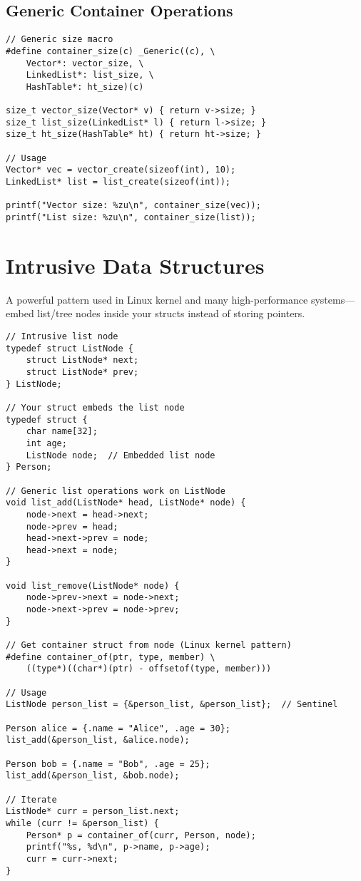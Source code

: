 \subsection{Generic Container Operations}

\begin{lstlisting}
// Generic size macro
#define container_size(c) _Generic((c), \
    Vector*: vector_size, \
    LinkedList*: list_size, \
    HashTable*: ht_size)(c)

size_t vector_size(Vector* v) { return v->size; }
size_t list_size(LinkedList* l) { return l->size; }
size_t ht_size(HashTable* ht) { return ht->size; }

// Usage
Vector* vec = vector_create(sizeof(int), 10);
LinkedList* list = list_create(sizeof(int));

printf("Vector size: %zu\n", container_size(vec));
printf("List size: %zu\n", container_size(list));
\end{lstlisting}

\section{Intrusive Data Structures}

A powerful pattern used in Linux kernel and many high-performance systems---embed list/tree nodes inside your structs instead of storing pointers.

\begin{lstlisting}
// Intrusive list node
typedef struct ListNode {
    struct ListNode* next;
    struct ListNode* prev;
} ListNode;

// Your struct embeds the list node
typedef struct {
    char name[32];
    int age;
    ListNode node;  // Embedded list node
} Person;

// Generic list operations work on ListNode
void list_add(ListNode* head, ListNode* node) {
    node->next = head->next;
    node->prev = head;
    head->next->prev = node;
    head->next = node;
}

void list_remove(ListNode* node) {
    node->prev->next = node->next;
    node->next->prev = node->prev;
}

// Get container struct from node (Linux kernel pattern)
#define container_of(ptr, type, member) \
    ((type*)((char*)(ptr) - offsetof(type, member)))

// Usage
ListNode person_list = {&person_list, &person_list};  // Sentinel

Person alice = {.name = "Alice", .age = 30};
list_add(&person_list, &alice.node);

Person bob = {.name = "Bob", .age = 25};
list_add(&person_list, &bob.node);

// Iterate
ListNode* curr = person_list.next;
while (curr != &person_list) {
    Person* p = container_of(curr, Person, node);
    printf("%s, %d\n", p->name, p->age);
    curr = curr->next;
}
\end{lstlisting}

